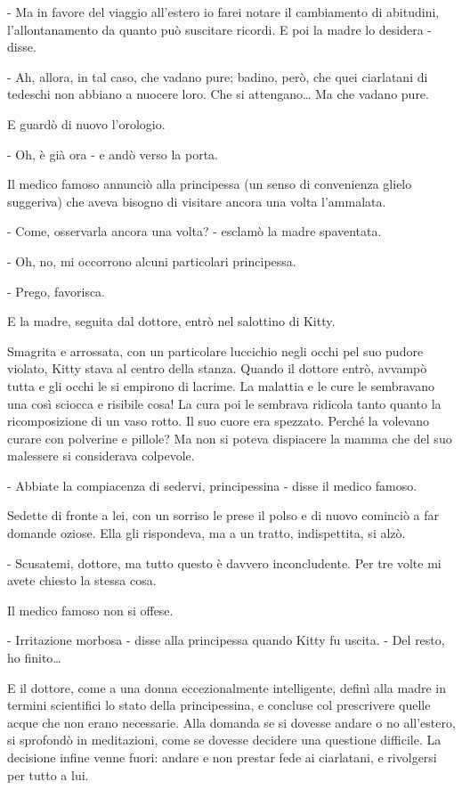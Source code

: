 - Ma in favore del viaggio all'estero io farei notare il cambiamento di abitudini, l'allontanamento da quanto può suscitare ricordi. E poi la madre lo desidera - disse. 

- Ah, allora, in tal caso, che vadano pure; badino, però, che quei ciarlatani di tedeschi non abbiano a nuocere loro. Che si attengano\ldots{} Ma che vadano pure. 

E guardò di nuovo l'orologio. 

- Oh, è già ora - e andò verso la porta. 

Il medico famoso annunciò alla principessa (un senso di convenienza glielo suggeriva) che aveva bisogno di visitare ancora una volta l'ammalata. 

- Come, osservarla ancora una volta? - esclamò la madre spaventata. 

- Oh, no, mi occorrono alcuni particolari principessa. 

- Prego, favorisca. 

E la madre, seguita dal dottore, entrò nel salottino di Kitty. 

Smagrita e arrossata, con un particolare luccichio negli occhi pel suo pudore violato, Kitty stava al centro della stanza. Quando il dottore entrò, avvampò tutta e gli occhi le si empirono di lacrime. La malattia e le cure le sembravano una così sciocca e risibile cosa! La cura poi le sembrava ridicola tanto quanto la ricomposizione di un vaso rotto. Il suo cuore era spezzato. Perché la volevano curare con polverine e pillole? Ma non si poteva dispiacere la mamma che del suo malessere si considerava colpevole. 

- Abbiate la compiacenza di sedervi, principessina - disse il medico famoso. 

Sedette di fronte a lei, con un sorriso le prese il polso e di nuovo cominciò a far domande oziose. Ella gli rispondeva, ma a un tratto, indispettita, si alzò. 

- Scusatemi, dottore, ma tutto questo è davvero inconcludente. Per tre volte mi avete chiesto la stessa cosa. 

Il medico famoso non si offese. 

- Irritazione morbosa - disse alla principessa quando Kitty fu uscita. - Del resto, ho finito\ldots{} 

E il dottore, come a una donna eccezionalmente intelligente, definì alla madre in termini scientifici lo stato della principessina, e concluse col prescrivere quelle acque che non erano necessarie. Alla domanda se si dovesse andare o no all'estero, si sprofondò in meditazioni, come se dovesse decidere una questione difficile. La decisione infine venne fuori: andare e non prestar fede ai ciarlatani, e rivolgersi per tutto a lui. 

